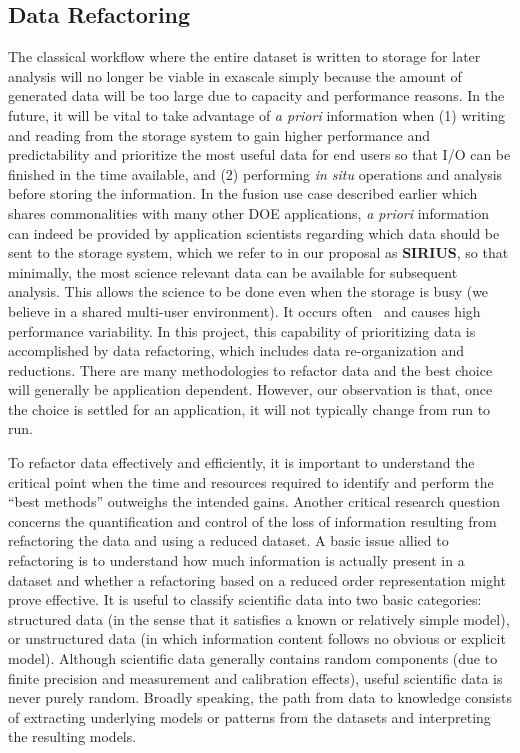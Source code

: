 \subsection{Data Refactoring} \label{sec:data-refactor} 

The classical workflow where the entire dataset is written to storage for
later analysis will no longer be viable in exascale simply because the amount of generated data will 
be too large due to capacity and performance reasons.
In the future, it will be vital to take advantage of \textit{a priori}
information when (1) writing and reading from the storage system to gain
higher performance and predictability and prioritize the most useful data 
for end users so that I/O can be finished in the time available, and (2)
performing {\em in situ} operations and analysis before storing the information.
In the fusion use case described earlier which shares commonalities with many other
DOE applications, \textit{a priori} information can indeed be provided by application
scientists regarding which data should be sent to the storage system, which we refer
to in our proposal as {\bf SIRIUS}, so that
minimally, the most science relevant data can be available for subsequent analysis.
This allows the science to be done even when the storage is busy (we believe
in a shared multi-user environment). It occurs often~\cite{liu_hotstorage} and causes
high performance variability.
In this project, this capability of prioritizing data is accomplished by data refactoring, 
which includes data re-organization and reductions.
There are many methodologies to refactor data and the best choice will generally
be application dependent. However, our observation is that, once the choice is settled for an application, 
it will not typically change from run to run. 

To refactor data effectively and efficiently, it is important to understand
the critical point when the time and resources required to
identify and perform the ``best methods'' outweighs the intended gains. Another
critical research question concerns the quantification and control of the loss
of information resulting from refactoring the data and using a reduced dataset. 
A basic issue allied to refactoring is to understand how much information is
actually present in a dataset and whether a refactoring based on a reduced
order representation might prove effective. It is useful to classify scientific
data into two basic categories: structured data (in the sense that it satisfies
a known or relatively simple model), or unstructured data (in which information
content follows no obvious or explicit model).  Although scientific data
generally contains random components (due to finite precision and measurement and
calibration effects), useful scientific data is never purely random.
Broadly speaking, the path from data to knowledge consists of extracting
underlying models or patterns from the datasets and interpreting the resulting
models. 

